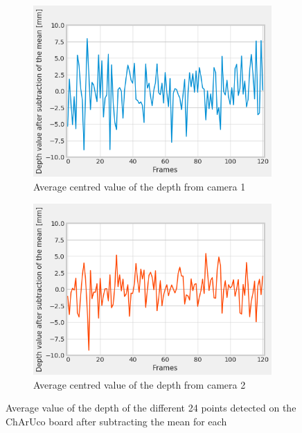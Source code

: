 \begin{figure}[H]
\centering
  \begin{subfigure}[b]{0.48 \textwidth}
    \includegraphics[width=\textwidth]{images/visual_enhancement/master_depth_frame_serie.png}
    \caption{Average centred value of the depth from camera 1}
    \label{figure:master_depth_frame_serie}
  \end{subfigure}
  \hfill
  \begin{subfigure}[b]{0.48 \textwidth}
    \includegraphics[width=\textwidth]{images/visual_enhancement/sub_depth_frame_serie.png}
    \caption{Average centred value of the depth from camera 2}
    \label{figure:sub_depth_frame_serie}
  \end{subfigure}
  \caption{Average value of the depth of the different 24 points detected on the ChArUco board after subtracting the mean for each}
  \label{figure:frame_serie}
\end{figure}


